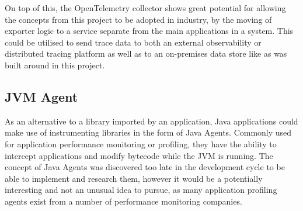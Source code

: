 \documentclass[12pt,pdftex,titlepage]{report}
\begin{document}
                On top of this, the OpenTelemetry collector shows great potential for allowing the concepts from this project to be adopted in industry, by the moving of exporter logic to a
                service separate from the main applications in a system. This could be utilised to send trace data to both an external observability or distributed tracing platform as well as
                to an on-premises data store like as was built around in this project.

            \subsection{JVM Agent}
                As an alternative to a library imported by an application, Java applications could make use of instrumenting libraries in the form of Java Agents. Commonly used for application performance monitoring
                or profiling, they have the ability to intercept applications and modify bytecode while the JVM is running\cite{javaagent}. The concept of Java Agents was discovered too late in the development cycle
                to be able to implement and research them, however it would be a potentially interesting and not an unusual idea to pursue, as many application profiling agents exist from a number of performance monitoring
                companies.
\end{document}
